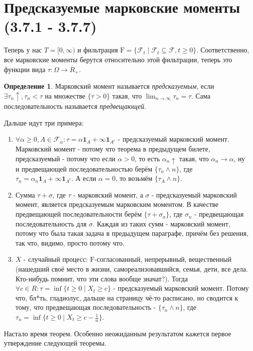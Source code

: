 \documentclass[16pt]{article}
\theoremstyle{definition}
\newtheorem{definition}[theorem]{Определение}
\begin{document}
\section{Предсказуемые марковские моменты (3.7.1 - 3.7.7)}
Теперь у нас $T = [0, \infty)$ и фильтрация $\mathrm{F} = \{\mathcal{F}_t \mid \mathcal{F}_t \subseteq \mathcal{F}, t \ge 0\}$. Соответственно, все марковские моменты берутся относительно этой фильтрации, теперь это функции вида $\tau: \Omega \rightarrow \overline{R}_+$.
\begin{definition}
Марковский момент называется \textit{предсказуемым}, если $\exists \tau_n\uparrow, \tau_n < \tau$ на множестве $\{\tau > 0\}$ такая, что $\lim_{n \rightarrow \infty} \tau_n = \tau$. Сама последовательность называется \textit{предвещающей}.
\end{definition}
Дальше идут три примера:
\begin{enumerate}
    \item $\forall \alpha \ge 0, A \in \mathcal{F}_\alpha: \tau = \alpha\mathbf{1}_A + \infty\mathbf{1}_{A^c}$ - предсказуемый марковский момент. Марковский момент - потому что теорема в предыдущем билете, предсказуемый - потому что если $\alpha > 0$, то есть $\alpha_n \uparrow$ такая, что $\alpha_n \rightarrow \alpha$, ну и предвещающей последовательностью берём $\{\tau_n \wedge n\}$, где $\tau_n = \alpha_n\mathbf{1}_A + \infty\mathbf{1}_{A^c}$. А если $\alpha = 0$, то возьмём $\{\tau_A \wedge n\}$.
    \item Сумма $\tau + \sigma$, где $\tau$ - марковский момент, а $\sigma$ - предсказуемый марковский момент, является предсказуемым марковским моментом. В качестве предвещающей последовательности берём $\{\tau + \sigma_n\}$, где $\sigma_n$ - предвещающая последовательность для $\sigma$. Каждая из таких сумм - марковский момент, потому что была такая задача в предыдущем параграфе, причём без решения, так что, видимо, просто потому что.
    \item $X$ - случайный процесс: $\mathrm{F}$-согласованный, непрерывный, вещественный (нашедший своё место в жизни, самореализовавшийся, семья, дети, все дела. Кто-нибудь помнит, что эти слова вообще значат?). Тогда $\forall c \in R: \tau = \inf\{t \ge 0 \mid X_t \ge c\}$ - предсказуемый марковский момент. Потому что, бл*ть, гладиолус, дальше на страницу чё-то расписано, но сводится к тому, что предвещающая последовательность - $\{\tau_n \wedge n\}$, где $\tau_n = \inf\{t \ge 0 \mid X_t \ge c - \frac{1}{n}\}$. 
\end{enumerate}
Настало время теорем. Особенно неожиданным результатом кажется первое утверждение следующей теоремы.
\end{document}
